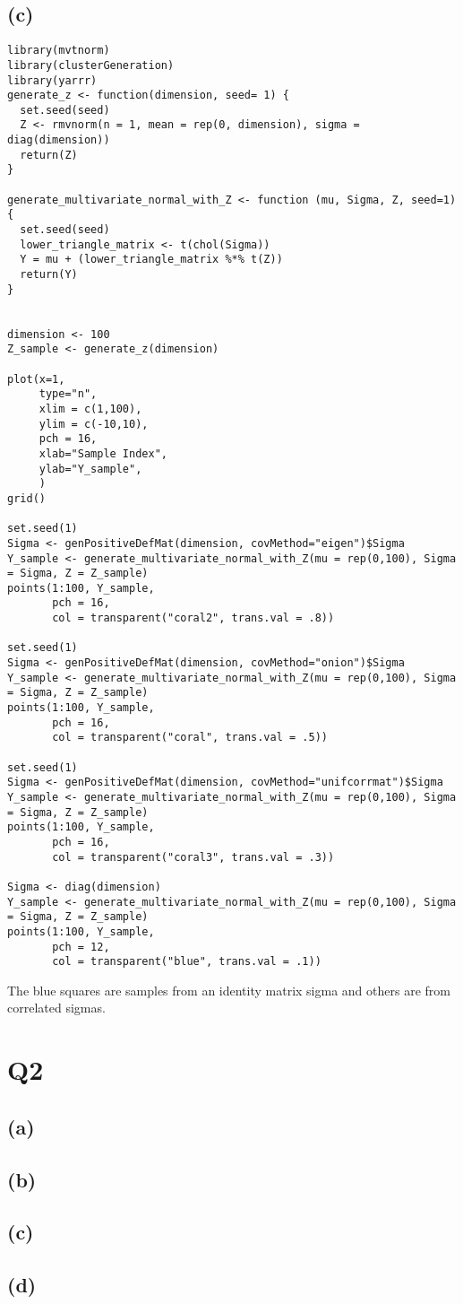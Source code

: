 \documentclass[11pt]{article}
\begin{document}
\subsection*{(c)}
 \begin{lstlisting}
library(mvtnorm)
library(clusterGeneration)
library(yarrr)
generate_z <- function(dimension, seed= 1) {
  set.seed(seed)
  Z <- rmvnorm(n = 1, mean = rep(0, dimension), sigma = diag(dimension))
  return(Z)
}

generate_multivariate_normal_with_Z <- function (mu, Sigma, Z, seed=1) {
  set.seed(seed)
  lower_triangle_matrix <- t(chol(Sigma))
  Y = mu + (lower_triangle_matrix %*% t(Z))
  return(Y)
}


dimension <- 100
Z_sample <- generate_z(dimension)

plot(x=1,
     type="n",
     xlim = c(1,100),
     ylim = c(-10,10),
     pch = 16,
     xlab="Sample Index",
     ylab="Y_sample",
     )
grid()

set.seed(1)
Sigma <- genPositiveDefMat(dimension, covMethod="eigen")$Sigma
Y_sample <- generate_multivariate_normal_with_Z(mu = rep(0,100), Sigma = Sigma, Z = Z_sample)
points(1:100, Y_sample,
       pch = 16,
       col = transparent("coral2", trans.val = .8))

set.seed(1)
Sigma <- genPositiveDefMat(dimension, covMethod="onion")$Sigma
Y_sample <- generate_multivariate_normal_with_Z(mu = rep(0,100), Sigma = Sigma, Z = Z_sample)
points(1:100, Y_sample,
       pch = 16,
       col = transparent("coral", trans.val = .5))

set.seed(1)
Sigma <- genPositiveDefMat(dimension, covMethod="unifcorrmat")$Sigma
Y_sample <- generate_multivariate_normal_with_Z(mu = rep(0,100), Sigma = Sigma, Z = Z_sample)
points(1:100, Y_sample,
       pch = 16,
       col = transparent("coral3", trans.val = .3))

Sigma <- diag(dimension)
Y_sample <- generate_multivariate_normal_with_Z(mu = rep(0,100), Sigma = Sigma, Z = Z_sample)
points(1:100, Y_sample,
       pch = 12,
       col = transparent("blue", trans.val = .1))
\end{lstlisting}

\begin{figure}[h!]
\end{figure}
The blue squares are samples from an identity matrix sigma and others are from correlated sigmas.

\section*{Q2}
\subsection*{(a)}
\subsection*{(b)}
\subsection*{(c)}
\subsection*{(d)}
 
\end{document}

